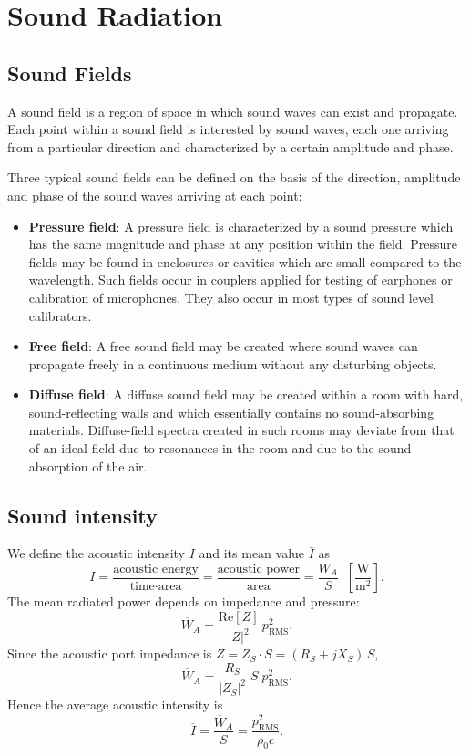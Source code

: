 \section{Sound Radiation}

\subsection{Sound Fields}

A sound field is a region of space in which sound waves can exist and propagate.
Each point within a sound field is interested by sound waves, each one arriving from a particular direction and characterized by a certain amplitude and phase.

Three typical sound fields can be defined on the basis of the direction, amplitude and phase of the sound waves arriving at each point:
\begin{itemize}
    \item \textbf{Pressure field}: A pressure field is characterized by a sound pressure which has the same magnitude and phase at any position within the field. Pressure fields may be found in enclosures or cavities which are small compared to the wavelength. Such fields occur in couplers applied for testing of earphones or calibration of microphones. They also occur in most types of sound level calibrators.
    \item \textbf{Free field}: A free sound field may be created where sound waves can propagate freely in a continuous medium without any disturbing objects.
    \item \textbf{Diffuse field}: A diffuse sound field may be created within a room with hard, sound-reflecting walls and which essentially contains no sound-absorbing materials. Diffuse-field spectra created in such rooms may deviate from that of an ideal field due to resonances in the room and due to the sound absorption of the air.
\end{itemize}

\subsection{Sound intensity}

We define the acoustic intensity \( I \) and its mean value \( \bar I \) as
\[
I=\frac{\text{acoustic energy}}{\text{time}\cdot\text{area}}
=\frac{\text{acoustic power}}{\text{area}}
=\frac{W_A}{S}\;\;\left[\frac{\mathrm{W}}{\mathrm{m}^2}\right].
\]
The mean radiated power depends on impedance and pressure:
\[
\overline{W}_A=\frac{\mathrm{Re}[Z]}{|Z|^{2}}\,p_{\mathrm{RMS}}^{2}.
\]
Since the acoustic port impedance is \(Z=Z_S\cdot S=(R_S+jX_S)\,S\),
\[
\overline{W}_A=\frac{R_S}{|Z_S|^{2}}\;S\;p_{\mathrm{RMS}}^{2}.
\]
Hence the average acoustic intensity is
\[
\overline{I}=\frac{\overline{W}_A}{S}=\frac{p_{\mathrm{RMS}}^{2}}{\rho_0 c}.
\]

